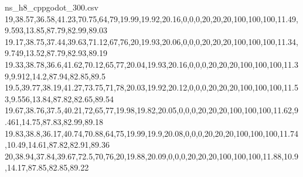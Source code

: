 \begin{filecontents*}[overwrite]{ns_h8_cppgodot_300.csv}
19,38.57,36.58,41.23,70.75,64,79,19.99,19.92,20.16,0,0,0,20,20,20,100,100,100,11.49,9.593,13.85,87.79,82.99,89.03
19.17,38.75,37.44,39.63,71.12,67,76,20,19.93,20.06,0,0,0,20,20,20,100,100,100,11.34,9.749,13.52,87.79,82.93,89.19
19.33,38.78,36.6,41.62,70.12,65,77,20.04,19.93,20.16,0,0,0,20,20,20,100,100,100,11.39,9.912,14.2,87.94,82.85,89.5
19.5,39.77,38.19,41.27,73.75,71,78,20.03,19.92,20.12,0,0,0,20,20,20,100,100,100,11.53,9.556,13.84,87.82,82.65,89.54
19.67,38.76,37.5,40.21,72,65,77,19.98,19.82,20.05,0,0,0,20,20,20,100,100,100,11.62,9.461,14.75,87.83,82.99,89.18
19.83,38.8,36.17,40.74,70.88,64,75,19.99,19.9,20.08,0,0,0,20,20,20,100,100,100,11.74,10.49,14.61,87.82,82.91,89.36
20,38.94,37.84,39.67,72.5,70,76,20,19.88,20.09,0,0,0,20,20,20,100,100,100,11.88,10.9,14.17,87.85,82.85,89.22
\end{filecontents*}

